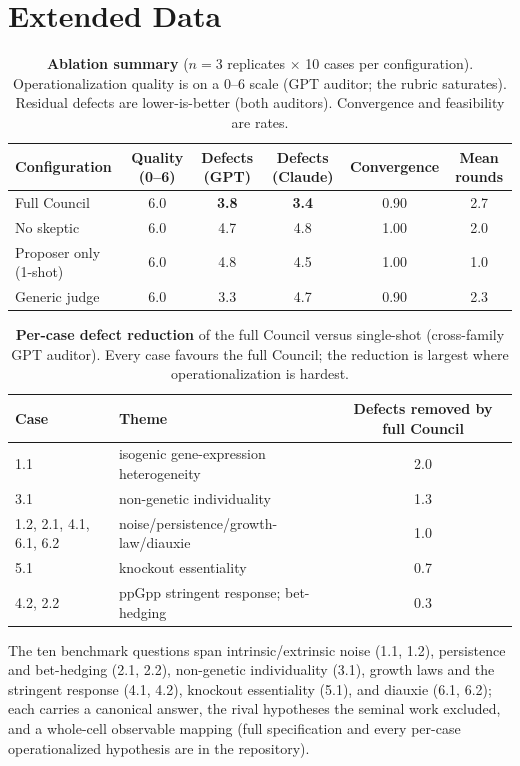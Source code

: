 \documentclass[11pt]{article}
\begin{document}
\section*{Extended Data}
\begin{table}[h]
\centering\small
\caption{\textbf{Ablation summary} ($n=3$ replicates $\times$ 10 cases per configuration). Operationalization
quality is on a 0--6 scale (GPT auditor; the rubric saturates). Residual defects are lower-is-better (both
auditors). Convergence and feasibility are rates.}
\begin{tabular}{lccccc}
\toprule
Configuration & Quality (0--6) & Defects (GPT) & Defects (Claude) & Convergence & Mean rounds\\
\midrule
Full Council & 6.0 & \textbf{3.8} & \textbf{3.4} & 0.90 & 2.7\\
No skeptic & 6.0 & 4.7 & 4.8 & 1.00 & 2.0\\
Proposer only (1-shot) & 6.0 & 4.8 & 4.5 & 1.00 & 1.0\\
Generic judge & 6.0 & 3.3 & 4.7 & 0.90 & 2.3\\
\bottomrule
\end{tabular}
\end{table}

\begin{table}[h]
\centering\small
\caption{\textbf{Per-case defect reduction} of the full Council versus single-shot (cross-family GPT auditor).
Every case favours the full Council; the reduction is largest where operationalization is hardest.}
\begin{tabular}{llc}
\toprule
Case & Theme & Defects removed by full Council\\
\midrule
1.1 & isogenic gene-expression heterogeneity & 2.0\\
3.1 & non-genetic individuality & 1.3\\
1.2, 2.1, 4.1, 6.1, 6.2 & noise/persistence/growth-law/diauxie & 1.0\\
5.1 & knockout essentiality & 0.7\\
4.2, 2.2 & ppGpp stringent response; bet-hedging & 0.3\\
\bottomrule
\end{tabular}
\end{table}

\noindent The ten benchmark questions span intrinsic/extrinsic noise (1.1, 1.2), persistence and bet-hedging
(2.1, 2.2), non-genetic individuality (3.1), growth laws and the stringent response (4.1, 4.2), knockout
essentiality (5.1), and diauxie (6.1, 6.2); each carries a canonical answer, the rival hypotheses the seminal
work excluded, and a whole-cell observable mapping (full specification and every per-case operationalized
hypothesis are in the repository).

\small


\end{document}
